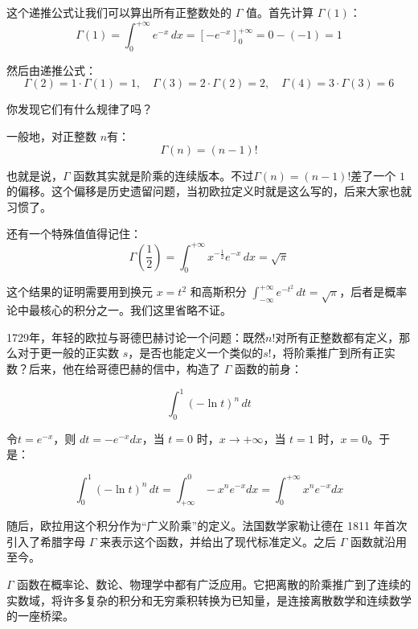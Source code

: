 这个递推公式让我们可以算出所有正整数处的 $\Gamma$ 值。首先计算 $\Gamma(1)$：
\[
\Gamma(1) = \int_0^{+\infty} e^{-x}\, dx = [-e^{-x}]_0^{+\infty} = 0 - (-1) = 1
\]

然后由递推公式：
\[
\Gamma(2) = 1 \cdot \Gamma(1) = 1,\quad
\Gamma(3) = 2 \cdot \Gamma(2) = 2,\quad
\Gamma(4) = 3 \cdot \Gamma(3) = 6
\]

你发现它们有什么规律了吗？

一般地，对正整数 $n$有：
\[
\Gamma(n) = (n-1)!
\]

也就是说，$\Gamma$ 函数其实就是阶乘的连续版本。不过$\Gamma(n) = (n-1)!$差了一个 $1$ 的偏移。这个偏移是历史遗留问题，当初欧拉定义时就是这么写的，后来大家也就习惯了。

还有一个特殊值值得记住：
\[
\Gamma(\frac{1}{2}) = \int_0^{+\infty} x^{-\frac{1}{2}} e^{-x}\, dx = \sqrt{\pi}
\]

这个结果的证明需要用到换元 $x = t^2$ 和高斯积分 $\int_{-\infty}^{+\infty} e^{-t^2}\, dt = \sqrt{\pi}$，后者是概率论中最核心的积分之一。我们这里省略不证。

1729年，年轻的欧拉与哥德巴赫讨论一个问题：既然$n!$对所有正整数都有定义，那么对于更一般的正实数 $s$，是否也能定义一个类似的$s!$，将阶乘推广到所有正实数？后来，他在给哥德巴赫的信中，构造了 $\Gamma$ 函数的前身：

\[
\int_{0}^{1} (-\ln t)^n  \,dt 
\]

令$t = e^{-x}$，则 $dt = -e^{-x} dx$，当 $t = 0$ 时，$x \to +\infty$，当 $t = 1$ 时，$x = 0$。于是：

\[\int_{0}^{1} (-\ln t)^n  \,dt = \int_{+\infty}^{0} -x^n e^{-x} dx=\int_{0}^{+\infty} x^n e^{-x} dx\]

随后，欧拉用这个积分作为“广义阶乘”的定义。法国数学家勒让德在 1811 年首次引入了希腊字母 $\Gamma$ 来表示这个函数，并给出了现代标准定义。之后 $\Gamma$ 函数就沿用至今。

$\Gamma$ 函数在概率论、数论、物理学中都有广泛应用。它把离散的阶乘推广到了连续的实数域，将许多复杂的积分和无穷乘积转换为已知量，是连接离散数学和连续数学的一座桥梁。